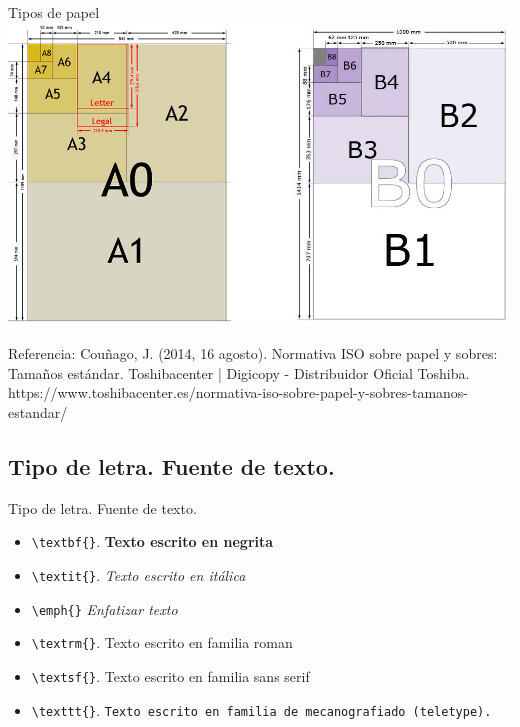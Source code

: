 \documentclass[aspectratio=169, 10pt]{beamer}
\begin{document}
\begin{frame}{Tipos de papel}
    \centering
    \includegraphics[scale=0.365]{Normativa-iso-sobre-papel-Serie-A-y-B.jpg} 

    \scriptsize{Referencia: Couñago, J. (2014, 16 agosto). Normativa ISO sobre papel y sobres: Tamaños estándar. Toshibacenter | Digicopy - Distribuidor Oficial Toshiba. https://www.toshibacenter.es/normativa-iso-sobre-papel-y-sobres-tamanos-estandar/}
    
\end{frame}


\subsection{Tipo de letra. Fuente de texto.}
\begin{frame}[fragile]{Tipo de letra. Fuente de texto.}

    \begin{itemize}
        \item \verb|\textbf{}|. \textbf{Texto escrito en negrita}
        \item \verb|\textit{}|. \textit{Texto escrito en itálica}
        \item \verb|\emph{}| \emph{Enfatizar texto}
        \item \verb|\textrm{}|. \textrm{Texto escrito en familia roman}
        \item \verb|\textsf{}|. \textsf{Texto escrito en familia sans serif}
        \item \verb|\texttt{}|. \texttt{Texto escrito en familia de mecanografiado (teletype).}
    \end{itemize}
    
    
\end{frame}
\end{document}
